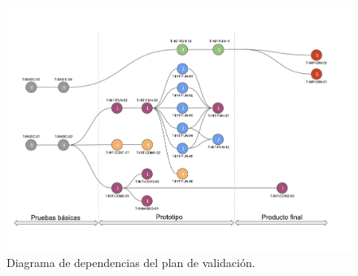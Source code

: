 \begin{figure}[H]
	\centering
	\includegraphics[width=0.9\linewidth,page=1]{ImagenesPlan de validacion/Diagrama de Dependencias de Validacion}
	\caption{Diagrama de dependencias del plan de validación.}
	\label{fig:diagrama_plan_validacion}
\end{figure}

%